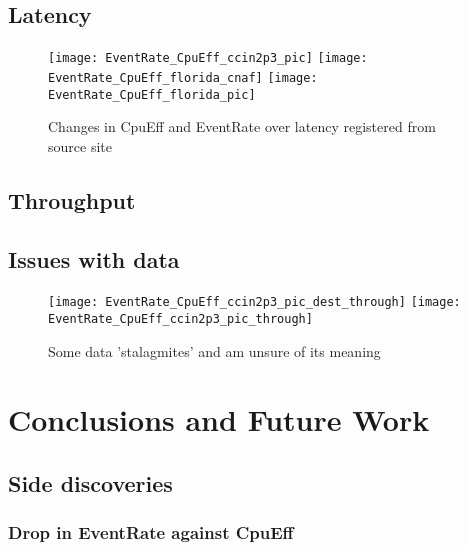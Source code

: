 \documentclass[]{scrartcl}
\begin{document}
\subsection{Latency}
\begin{figure}
	\caption{Changes in CpuEff and EventRate over latency registered from source site}
	\centering
	\texttt{[image: EventRate\_CpuEff\_ccin2p3\_pic]}
	\texttt{[image: EventRate\_CpuEff\_florida\_cnaf]}
	\texttt{[image: EventRate\_CpuEff\_florida\_pic]}
\end{figure}
\subsection{Throughput}
\subsection{Issues with data}
\begin{figure}
	\caption{Some data 'stalagmites' and am unsure of its meaning}
    \centering
	\texttt{[image: EventRate\_CpuEff\_ccin2p3\_pic\_dest\_through]}
	\texttt{[image: EventRate\_CpuEff\_ccin2p3\_pic\_through]}
\end{figure}

\section{Conclusions and Future Work}
\subsection{Side discoveries}
\subsubsection{Drop in EventRate against CpuEff}
\end{document}
